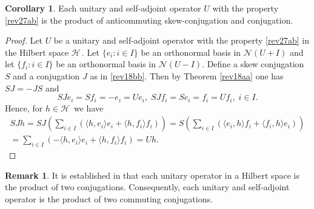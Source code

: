 \documentclass[12pt]{amsart}
\theoremstyle{definition}
\newtheorem{rem}[thm]{Remark}
\newtheorem{cor}[thm]{Corollary}
\newcommand{\cH}{\mathcal{H}\,}
\newcommand{\cN}{\mathcal{N}}
\begin{document}
\begin{cor}\label{rev26a}
Each  unitary and self-adjoint operator $U$ with the property \eqref{rev27ab} is the product of anticommuting skew-conjugation and conjugation.
\end{cor}
\begin{proof}
Let $U$ be a unitary and self-adjoint operator with the property \eqref{rev27ab} in the Hilbert space $\cH$. Let $\{e_i: i\in I\}$ be an orthonormal basis in $\cN(U+I)$ and let $\{f_i:i\in I\}$ be an orthonormal basis in $\cN(U-I)$. Define a skew conjugation $S$ and a conjugation $J$ as in \eqref{rev18bb}.
Then by Theorem \ref{rev18aa} one has $SJ=-JS$ and
$$SJe_i=Sf_i=-e_i=Ue_i,\; SJf_i=Se_i=f_i=Uf_i,\; i\in I.$$
Hence, for $h\in\cH$ we have
\[
\begin{array}{l}
SJ h=SJ\left(\sum\limits_{i\in I} \left(\langle h,e_i\rangle e_i+\langle h,f_i\rangle f_i\right)\right)=S\left(\sum\limits_{i\in I} \left(\langle e_i,h\rangle f_i+\langle f_i,h\rangle e_i\right)\right)\\[2mm]
=\sum\limits_{i\in I} \left(-\langle h,e_i\rangle e_i+\langle h, f_i\rangle f_i\right)= Uh.
\end{array}
\]
\end{proof}

\begin{rem}\label{rev26b}
It is established in \cite{godluc} that each unitary operator in a Hilbert space is the product of two conjugations. Consequently, each unitary and self-adjoint operator is the product of two commuting conjugations.

\end{rem}
\end{document}

